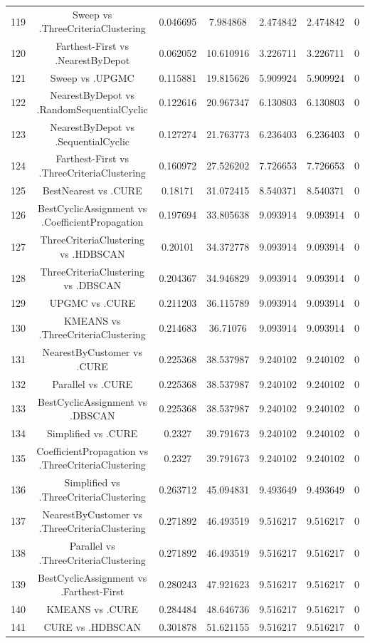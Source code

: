 \documentclass[a4paper,10pt]{article}
\begin{document}
\begin{landscape}
\begin{table}[!htp]
\begin{tabular}{ccccccc}
119&Sweep vs .ThreeCriteriaClustering&0.046695&7.984868&2.474842&2.474842&0\\
120&Farthest-First vs .NearestByDepot&0.062052&10.610916&3.226711&3.226711&0\\
121&Sweep vs .UPGMC&0.115881&19.815626&5.909924&5.909924&0\\
122&NearestByDepot vs .RandomSequentialCyclic&0.122616&20.967347&6.130803&6.130803&0\\
123&NearestByDepot vs .SequentialCyclic&0.127274&21.763773&6.236403&6.236403&0\\
124&Farthest-First vs .ThreeCriteriaClustering&0.160972&27.526202&7.726653&7.726653&0\\
125&BestNearest vs .CURE&0.18171&31.072415&8.540371&8.540371&0\\
126&BestCyclicAssignment vs .CoefficientPropagation&0.197694&33.805638&9.093914&9.093914&0\\
127&ThreeCriteriaClustering vs .HDBSCAN&0.20101&34.372778&9.093914&9.093914&0\\
128&ThreeCriteriaClustering vs .DBSCAN&0.204367&34.946829&9.093914&9.093914&0\\
129&UPGMC vs .CURE&0.211203&36.115789&9.093914&9.093914&0\\
130&KMEANS vs .ThreeCriteriaClustering&0.214683&36.71076&9.093914&9.093914&0\\
131&NearestByCustomer vs .CURE&0.225368&38.537987&9.240102&9.240102&0\\
132&Parallel vs .CURE&0.225368&38.537987&9.240102&9.240102&0\\
133&BestCyclicAssignment vs .DBSCAN&0.225368&38.537987&9.240102&9.240102&0\\
134&Simplified vs .CURE&0.2327&39.791673&9.240102&9.240102&0\\
135&CoefficientPropagation vs .ThreeCriteriaClustering&0.2327&39.791673&9.240102&9.240102&0\\
136&Simplified vs .ThreeCriteriaClustering&0.263712&45.094831&9.493649&9.493649&0\\
137&NearestByCustomer vs .ThreeCriteriaClustering&0.271892&46.493519&9.516217&9.516217&0\\
138&Parallel vs .ThreeCriteriaClustering&0.271892&46.493519&9.516217&9.516217&0\\
139&BestCyclicAssignment vs .Farthest-First&0.280243&47.921623&9.516217&9.516217&0\\
140&KMEANS vs .CURE&0.284484&48.646736&9.516217&9.516217&0\\
141&CURE vs .HDBSCAN&0.301878&51.621155&9.516217&9.516217&0\\

\end{tabular}
\end{table}
\end{landscape}
\end{document}
